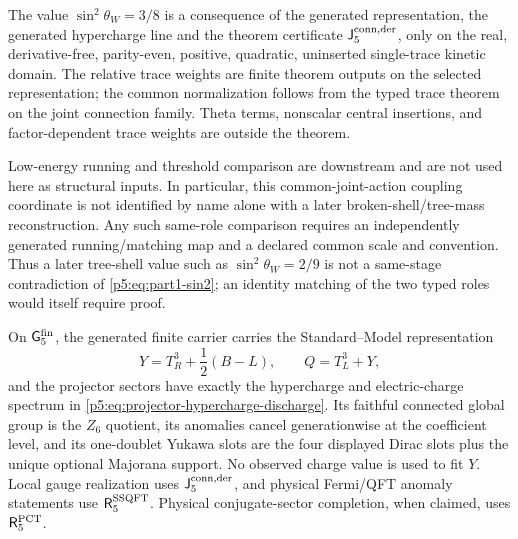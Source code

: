 \documentclass[12pt,a4paper]{article}
\begin{document}
\begin{remark}
\label{p5:rem:weak-angle-normalization-status}
The value \(\sin^2\theta_W=3/8\) is a consequence of the generated
representation, the generated hypercharge line and the theorem certificate
\(\mathsf J_5^{\rm conn,der}\), only on the real, derivative-free, parity-even,
positive, quadratic, uninserted single-trace kinetic domain.  The relative
trace weights are finite theorem outputs on the selected representation; the
common normalization follows from the typed trace theorem on the joint
connection family.  Theta terms, nonscalar central insertions, and
factor-dependent trace weights are outside the theorem.

Low-energy running and threshold comparison are downstream and are not used here as structural inputs.  In particular, this common-joint-action coupling
coordinate is not identified by name alone with a later broken-shell/tree-mass
reconstruction.  Any such same-role comparison requires an independently
generated running/matching map and a declared common scale and convention.
Thus a later tree-shell value such as \(\sin^2\theta_W=2/9\) is not a
same-stage contradiction of \eqref{p5:eq:part1-sin2}; an identity matching of
the two typed roles would itself require proof.
\end{remark}

\begin{theorem}
\label{p5:thm:conditional-sm-representation}
\label{p5:thm:part1-anchor-free-sm-carrier}
On \(\mathsf G_5^{\rm fin}\), the generated finite
carrier carries the
Standard--Model representation
\begin{equation}
Y=T_R^3+\frac12(B-L),
\qquad
Q=T_L^3+Y,
\end{equation}
and the projector sectors have exactly the hypercharge and electric-charge
spectrum in \eqref{p5:eq:projector-hypercharge-discharge}.  Its faithful
connected global group is the \(Z_6\) quotient, its anomalies cancel
generationwise at the coefficient level, and its one-doublet Yukawa slots are
the four displayed Dirac slots plus the unique optional Majorana support.  No
observed charge value is used to fit \(Y\).  Local gauge realization uses
\(\mathsf J_5^{\rm conn,der}\), and physical Fermi/QFT anomaly statements use
\(\mathsf R_5^{\rm SSQFT}\).  Physical conjugate-sector completion, when
claimed, uses \(\mathsf R_5^{\rm PCT}\).
\end{theorem}
\end{document}
